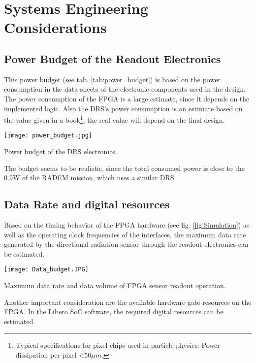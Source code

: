 \section{Systems Engineering Considerations}
\label{sec:systems_engineering}

\subsection{Power Budget of the Readout Electronics}
\label{sec:power_budget}
This power budget (see tab. \ref{tab:power_budget}) is based on the power consumption in the data sheets of the electronic components used in the design.
The power consumption of the FPGA is a large estimate, since it depends on the implemented logic.
Also the DRS's power consumption is an estimate based on the value given in a book\footnote{Typical specifications for pixel chips used in particle physics: Power dissipation per pixel \textless $50\mu m$.\cite{rossi2006pixel}}, the real value will depend on the final design.
\begin{table}[H]
	\centering
    \texttt{[image: power\_budget.jpg]}
    \caption[Power Budget]{Power budget of the DRS electronics.}
	\label{tab:power_budget}
\end{table}

The budget seems to be realistic, since the total consumed power is close to the 0.9W\cite[p. 11, tab. 4]{tantalumproject2016} of the RADEM mission, which uses a similar DRS.

\subsection{Data Rate and digital resources}
Based on the timing behavior of the FPGA hardware (see fig. \ref{fig:Simulation}) as well as the operating clock frequencies of the interfaces, the maximum data rate generated by the directional radiation sensor through the readout electronics can be estimated. 

\begin{table}[H]
	\centering
    \texttt{[image: Data\_budget.JPG]}
    \caption[Data Budget]{Maximum data rate and data volume of FPGA sensor readout operation.}
	\label{tab:data_budget}
\end{table}

Another important consideration are the available hardware gate resources on the FPGA. In the Libero SoC software, the required digital resources can be estimated.

